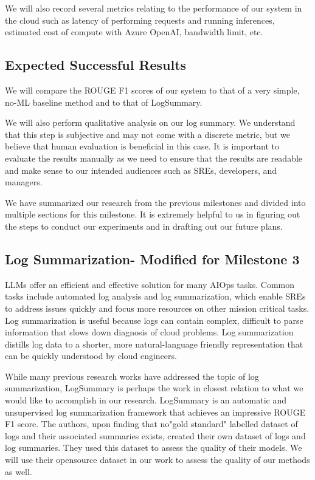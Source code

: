 \documentclass[conference]{IEEEtran}
\begin{document}
We will also record several metrics relating to the performance of our system in the cloud such as latency of performing requests and running inferences, estimated cost of compute with Azure OpenAI, bandwidth limit, etc.

\subsection{Expected Successful Results}
We will compare the ROUGE F1 scores of our system to that of a very simple, no-ML baseline method \cite{medium-text-summarization} and to that of LogSummary. \cite{10017337} 

We will also perform qualitative analysis on our log summary. We understand that this step is subjective and may not come with a discrete metric, but we believe that human evaluation is beneficial in this case. It is important to evaluate the results manually as we need to ensure that the results are readable and make sense to our intended audiences such as SREs, developers, and managers.

We have summarized our research from the previous milestones and divided into multiple sections for this milestone. It is extremely helpful to us in figuring out the steps to conduct our experiments and in drafting out our future plans.
\subsection{Log Summarization- Modified for Milestone 3}

LLMs offer an efficient and effective solution for many AIOps tasks. Common tasks include automated log analysis and log summarization, which enable SREs to address issues quickly and focus more resources on other mission critical tasks.\cite{gupta2023learning} Log summarization is useful because logs can contain complex, difficult to parse information that slows down diagnosis of cloud problems. Log summarization distills log data to a shorter, more natural-language friendly representation that can be quickly understood by cloud engineers.

While many previous research works have addressed the topic of log summarization, LogSummary \cite{10017337} is perhaps the work in closest relation to what we would like to accomplish in our research. LogSummary is an automatic and unsupervised log summarization framework that achieves an impressive ROUGE F1 score. The authors, upon finding that no"gold standard" labelled dataset of logs and their associated summaries exists, created their own dataset of logs and log summaries. They used this dataset to assess the quality of their models. We will use their opensource dataset in our work to assess the quality of our methods as well.
\end{document}
